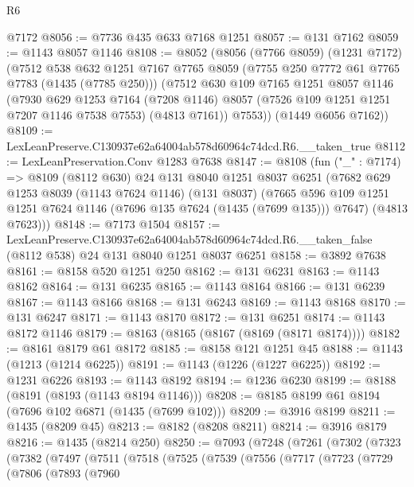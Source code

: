 \begin{lexlean}{R6}
\begin{coremodule}
    @7172
@8056 := @7736 @435 @633 @7168 @1251
@8057 := @131 @7162
@8059 := @1143 @8057 @1146
@8108 := @8052
    (@8056
      (@7766 @8059)
      (@1231 @7172)
      (@7512
        @538
        @632
        @1251
        @7167
        @7765
        @8059
        (@7755 @250 @7772 @61 @7765 @7783 (@1435 (@7785 @250)))
        (@7512
          @630
          @109
          @7165
          @1251
          @8057
          @1146
          (@7930
            @629
            @1253
            @7164
            (@7208 @1146)
            @8057
            (@7526 @109 @1251 @1251 @7207 @1146 @7538 @7553)
            (@4813 @7161))
          @7553))
      (@1449 @6056 @7162))
@8109 := LexLeanPreserve.C130937e62a64004ab578d60964c74dcd.R6.__taken_true
@8112 := LexLeanPreservation.Conv @1283 @7638
@8147 := @8108
    (fun ("_" : @7174) =>
    @8109
      (@8112 @630)
      @24
      @131
      @8040
      @1251
      @8037
      @6251
      (@7682
        @629
        @1253
        @8039
        (@1143 @7624 @1146)
        (@131 @8037)
        (@7665 @596 @109 @1251 @1251 @7624 @1146 (@7696 @135 @7624 (@1435 (@7699 @135))) @7647)
        (@4813 @7623)))
@8148 := @7173 @1504
@8157 := LexLeanPreserve.C130937e62a64004ab578d60964c74dcd.R6.__taken_false
    (@8112 @538)
    @24
    @131
    @8040
    @1251
    @8037
    @6251
@8158 := @3892 @7638
@8161 := @8158 @520 @1251 @250
@8162 := @131 @6231
@8163 := @1143 @8162
@8164 := @131 @6235
@8165 := @1143 @8164
@8166 := @131 @6239
@8167 := @1143 @8166
@8168 := @131 @6243
@8169 := @1143 @8168
@8170 := @131 @6247
@8171 := @1143 @8170
@8172 := @131 @6251
@8174 := @1143 @8172 @1146
@8179 := @8163 (@8165 (@8167 (@8169 (@8171 @8174))))
@8182 := @8161 @8179 @61 @8172
@8185 := @8158 @121 @1251 @45
@8188 := @1143 (@1213 (@1214 @6225))
@8191 := @1143 (@1226 (@1227 @6225))
@8192 := @1231 @6226
@8193 := @1143 @8192
@8194 := @1236 @6230
@8199 := @8188 (@8191 (@8193 (@1143 @8194 @1146)))
@8208 := @8185 @8199 @61 @8194 (@7696 @102 @6871 (@1435 (@7699 @102)))
@8209 := @3916 @8199
@8211 := @1435 (@8209 @45)
@8213 := @8182 (@8208 @8211)
@8214 := @3916 @8179
@8216 := @1435 (@8214 @250)
@8250 := @7093
    (@7248
      (@7261
        (@7302
          (@7323
            (@7382
              (@7497
                (@7511
                  (@7518
                    (@7525
                      (@7539
                        (@7556
                          (@7717
                            (@7723
                              (@7729
                                (@7806
                                  (@7893
                                    (@7960

\end{coremodule}
\end{lexlean}
